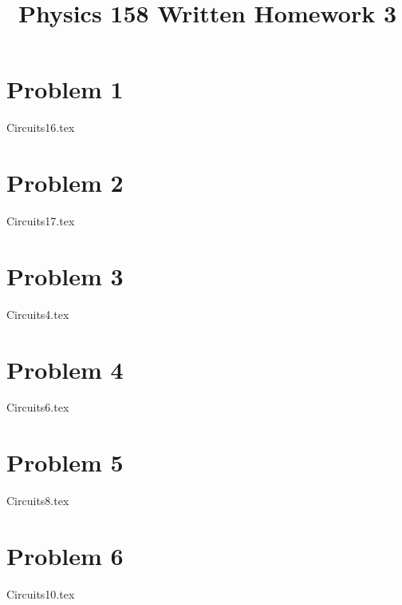 \documentclass[11pt, fleqn]{article}
\title{Physics 158 Written Homework 3}
\author{}
\date{}
\begin{document}
\allowdisplaybreaks

\maketitle

\section*{Problem 1}
{Circuits16.tex}
\section*{Problem 2}
{Circuits17.tex}
\section*{Problem 3}
{Circuits4.tex}
\section*{Problem 4}
{Circuits6.tex}
\section*{Problem 5}
{Circuits8.tex}
\section*{Problem 6}
{Circuits10.tex}
\end{document}
